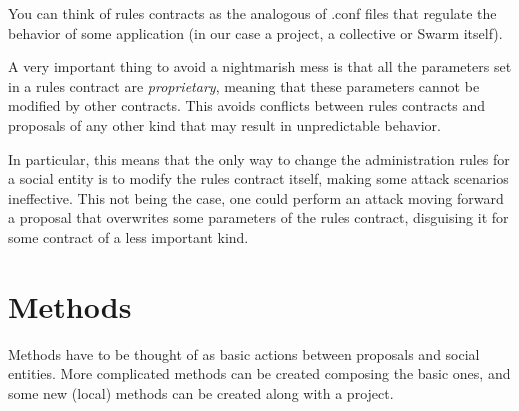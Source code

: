 \documentclass[submission, copyright,creativecommons,sharealike,noncommercial]{eptcs}
\begin{document}
		You can think of rules contracts as the analogous of .conf files that regulate the behavior of some application (in our case a project, a collective or Swarm itself).
		
		A very important thing to avoid a nightmarish mess is that all the parameters set in a rules contract are \emph{proprietary}, meaning that these parameters cannot be modified by other contracts. This avoids conflicts between rules contracts and proposals of any other kind that may result in unpredictable behavior. 
		
		In particular, this means that the only way to change the administration rules for a social entity is to modify the rules contract itself, making some attack scenarios ineffective. This not being the case, one could perform an attack moving forward a proposal that overwrites some parameters of the rules contract, disguising it for some contract of a less important kind.
	

\section{Methods}
	Methods have to be thought of as basic actions between proposals and social entities. More complicated methods can be created composing the basic ones, and some new (local) methods can be created along with a project.
	
\end{document}
